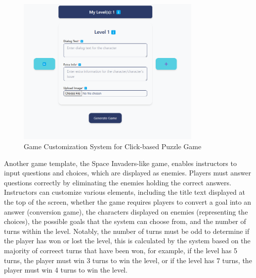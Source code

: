\begin{figure}
	\centering
	\includegraphics[width=0.8\textwidth]{figures/Diagnose_Game/Instructor_Portal_Diagnose_Game.png}
	\caption{Game Customization System for Click-based Puzzle Game}
	\label{fig:customizationClickPuzzle}
\end{figure}


Another game template, the Space Invaders-like game, enables instructors to input questions and choices, which are displayed as enemies. Players must answer questions correctly by eliminating the enemies holding the correct answers. Instructors can customize various elements, including the title text displayed at the top of the screen, whether the game requires players to convert a goal into an answer (conversion game), the characters displayed on enemies (representing the choices), the possible goals that the system can choose from, and the number of turns within the level. Notably, the number of turns must be odd to determine if the player has won or lost the level, this is calculated by the system based on the majority of correect turns that have been won, for example, if the level has 5 turns, the player must win 3 turns to win the level, or if the level has 7 turns, the player must win 4 turns to win the level.

